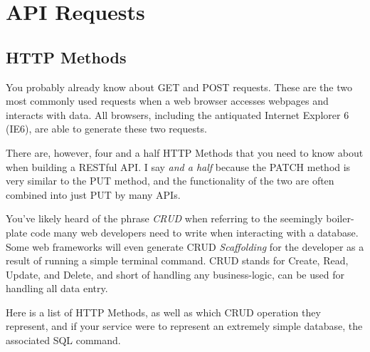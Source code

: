 \chapter{API Requests}

\section{HTTP Methods}

You probably already know about GET and POST requests. These are the two most commonly used requests when a web browser accesses webpages and interacts with data. All browsers, including the antiquated Internet Explorer 6 (IE6), are able to generate these two requests.

There are, however, four and a half HTTP Methods that you need to know about when building a RESTful API. I say \emph{and a half} because the PATCH method is very similar to the PUT method, and the functionality of the two are often combined into just PUT by many APIs.

You've likely heard of the phrase \emph{CRUD} when referring to the seemingly boiler-plate code many web developers need to write when interacting with a database. Some web frameworks will even generate CRUD \emph{Scaffolding} for the developer as a result of running a simple terminal command. CRUD stands for Create, Read, Update, and Delete, and short of handling any business-logic, can be used for handling all data entry.

Here is a list of HTTP Methods, as well as which CRUD operation they represent, and if your service were to represent an extremely simple database, the associated SQL command.


